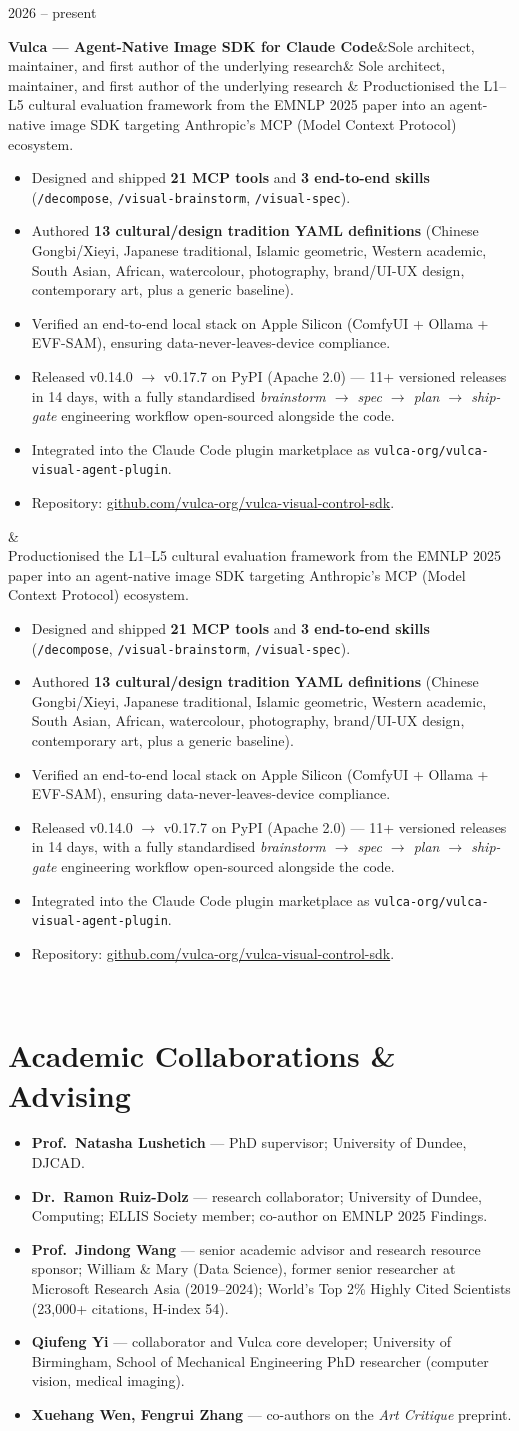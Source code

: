 \documentclass[10.5pt,a4paper]{article}
\newcommand{\cventry}[4]{%
  \noindent\begin{minipage}[t]{0.18\linewidth}\color{muted}\small #1\end{minipage}%
  \begin{minipage}[t]{0.80\linewidth}%
    \textbf{#2}\ifx&#3&\else{} \textperiodcentered{} {\color{muted}#3}\fi%
    \ifx&#4&\else\\[2pt]\small #4\fi%
  \end{minipage}\\[6pt]%
}
\begin{document}
\cventry{2026 – present}
  {Vulca — Agent-Native Image SDK for Claude Code}
  {Sole architect, maintainer, and first author of the underlying research}
  {%
  Productionised the L1–L5 cultural evaluation framework from the EMNLP 2025 paper into
  an agent-native image SDK targeting Anthropic's MCP (Model Context Protocol) ecosystem.
  \begin{itemize}
    \item Designed and shipped \textbf{21 MCP tools} and \textbf{3 end-to-end skills}
    (\texttt{/decompose}, \texttt{/visual-brainstorm}, \texttt{/visual-spec}).
    \item Authored \textbf{13 cultural/design tradition YAML definitions}
    (Chinese Gongbi/Xieyi, Japanese traditional, Islamic geometric, Western academic,
    South Asian, African, watercolour, photography, brand/UI-UX design, contemporary art,
    plus a generic baseline).
    \item Verified an end-to-end local stack on Apple Silicon (ComfyUI + Ollama + EVF-SAM),
    ensuring data-never-leaves-device compliance.
    \item Released v0.14.0 $\to$ v0.17.7 on PyPI (Apache 2.0) — 11+ versioned releases in 14 days,
    with a fully standardised \emph{brainstorm $\to$ spec $\to$ plan $\to$ ship-gate} engineering workflow
    open-sourced alongside the code.
    \item Integrated into the Claude Code plugin marketplace as \texttt{vulca-org/vulca-visual-agent-plugin}.
    \item Repository: \href{https://github.com/vulca-org/vulca-visual-control-sdk}{github.com/vulca-org/vulca-visual-control-sdk}.
  \end{itemize}}

\section*{Academic Collaborations \& Advising}

\begin{itemize}
  \item \textbf{Prof.~Natasha Lushetich} — PhD supervisor; University of Dundee, DJCAD.
  \item \textbf{Dr.~Ramon Ruiz-Dolz} — research collaborator; University of Dundee, Computing;
  ELLIS Society member; co-author on EMNLP 2025 Findings.
  \item \textbf{Prof.~Jindong Wang} — senior academic advisor and research resource sponsor;
  William \& Mary (Data Science), former senior researcher at Microsoft Research Asia (2019–2024);
  World's Top 2\% Highly Cited Scientists (23{,}000+ citations, H-index 54).
  \item \textbf{Qiufeng Yi} — collaborator and Vulca core developer;
  University of Birmingham, School of Mechanical Engineering PhD researcher (computer vision, medical imaging).
  \item \textbf{Xuehang Wen, Fengrui Zhang} — co-authors on the \emph{Art Critique} preprint.
\end{itemize}
\end{document}

